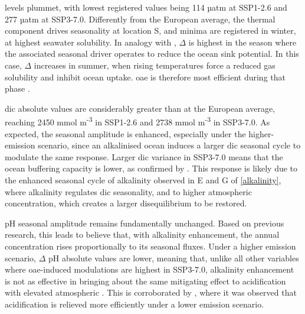  levels plummet, with lowest registered values being 114 µatm at SSP1-2.6 and 277 µatm at SSP3-7.0. Differently from the European average, the thermal component drives seasonality at location S, and minima are registered in winter, at highest seawater solubility. In analogy with \cite{fassbender2018seasonal}, $\Delta$  is highest in the season where the associated seasonal driver operates to reduce the ocean  sink potential. In this case, $\Delta$  increases in summer, when rising temperatures force a reduced gas solubility and inhibit ocean uptake. \ac{oae} is therefore most efficient during that phase \citep{fassbender2018seasonal}. 

\ac{dic} absolute values are considerably greater than at the European average, reaching 2450 mmol m\textsuperscript{-3} in SSP1-2.6 and 2738 mmol m\textsuperscript{-3} in SSP3-7.0. As expected, the seasonal amplitude is enhanced, especially under the higher-emission scenario, since an alkalinised ocean induces a larger \ac{dic} seasonal cycle to modulate the same  response. Larger \ac{dic} variance in SSP3-7.0 means that the ocean buffering capacity is lower, as confirmed by \cite{lenton2018assessing}. This response is likely due to the enhanced seasonal cycle of alkalinity observed in E and G of \cref{alkalinity}, where alkalinity regulates \ac{dic} seasonality, and to higher atmospheric  concentration, which creates a larger disequilibrium to be restored.  

pH seasonal amplitude remains fundamentally unchanged. Based on previous research, this leads to believe that, with alkalinity enhancement, the annual  concentration rises proportionally to its seasonal fluxes. Under a higher emission scenario, $\Delta$ pH absolute values are lower, meaning that, unlike all other variables where \ac{oae}-induced modulations are highest in SSP3-7.0, alkalinity enhancement is not as effective in bringing about the same mitigating effect to acidification with elevated atmospheric . This is corroborated by \cite{lenton2018assessing}, where it was observed that acidification is relieved more efficiently under a lower emission scenario.  
